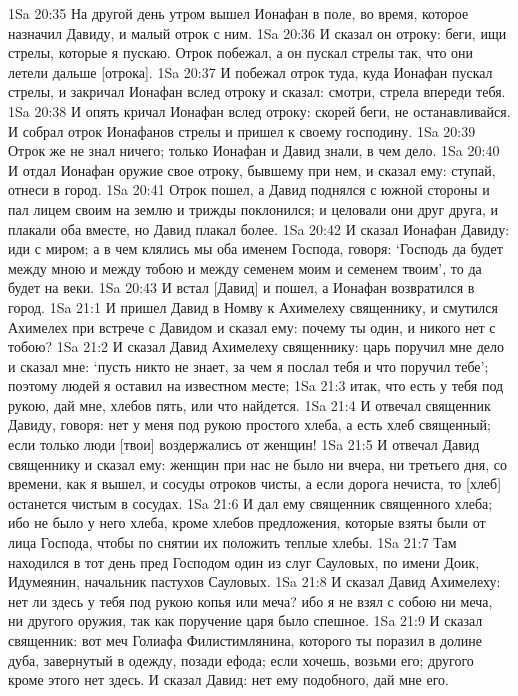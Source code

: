 1Sa 20:35  На другой день утром вышел Ионафан в поле, во время, которое назначил Давиду, и малый отрок с ним.
1Sa 20:36  И сказал он отроку: беги, ищи стрелы, которые я пускаю. Отрок побежал, а он пускал стрелы так, что они летели дальше [отрока].
1Sa 20:37  И побежал отрок туда, куда Ионафан пускал стрелы, и закричал Ионафан вслед отроку и сказал: смотри, стрела впереди тебя.
1Sa 20:38  И опять кричал Ионафан вслед отроку: скорей беги, не останавливайся. И собрал отрок Ионафанов стрелы и пришел к своему господину.
1Sa 20:39  Отрок же не знал ничего; только Ионафан и Давид знали, в чем дело.
1Sa 20:40  И отдал Ионафан оружие свое отроку, бывшему при нем, и сказал ему: ступай, отнеси в город.
1Sa 20:41  Отрок пошел, а Давид поднялся с южной стороны и пал лицем своим на землю и трижды поклонился; и целовали они друг друга, и плакали оба вместе, но Давид плакал более.
1Sa 20:42  И сказал Ионафан Давиду: иди с миром; а в чем клялись мы оба именем Господа, говоря: `Господь да будет между мною и между тобою и между семенем моим и семенем твоим', то да будет на веки.
1Sa 20:43  И встал [Давид] и пошел, а Ионафан возвратился в город.
1Sa 21:1  И пришел Давид в Номву к Ахимелеху священнику, и смутился Ахимелех при встрече с Давидом и сказал ему: почему ты один, и никого нет с тобою?
1Sa 21:2  И сказал Давид Ахимелеху священнику: царь поручил мне дело и сказал мне: `пусть никто не знает, за чем я послал тебя и что поручил тебе'; поэтому людей я оставил на известном месте;
1Sa 21:3  итак, что есть у тебя под рукою, дай мне, хлебов пять, или что найдется.
1Sa 21:4  И отвечал священник Давиду, говоря: нет у меня под рукою простого хлеба, а есть хлеб священный; если только люди [твои] воздержались от женщин!
1Sa 21:5  И отвечал Давид священнику и сказал ему: женщин при нас не было ни вчера, ни третьего дня, со времени, как я вышел, и сосуды отроков чисты, а если дорога нечиста, то [хлеб] останется чистым в сосудах.
1Sa 21:6  И дал ему священник священного хлеба; ибо не было у него хлеба, кроме хлебов предложения, которые взяты были от лица Господа, чтобы по снятии их положить теплые хлебы.
1Sa 21:7  Там находился в тот день пред Господом один из слуг Сауловых, по имени Доик, Идумеянин, начальник пастухов Сауловых.
1Sa 21:8  И сказал Давид Ахимелеху: нет ли здесь у тебя под рукою копья или меча? ибо я не взял с собою ни меча, ни другого оружия, так как поручение царя было спешное.
1Sa 21:9  И сказал священник: вот меч Голиафа Филистимлянина, которого ты поразил в долине дуба, завернутый в одежду, позади ефода; если хочешь, возьми его; другого кроме этого нет здесь. И сказал Давид: нет ему подобного, дай мне его.
